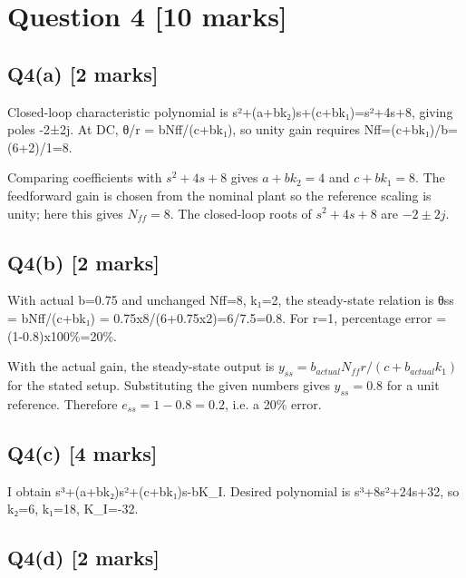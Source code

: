 \documentclass[11pt,a4paper]{article}
\begin{document}
\section*{Question 4 \hfill [10 marks]}
\subsection*{Q4(a) \hfill [2 marks]}

Closed-loop characteristic polynomial is s²+(a+bk₂)s+(c+bk₁)=s²+4s+8, giving poles -2±2j.
At DC, θ/r = bNff/(c+bk₁), so unity gain requires Nff=(c+bk₁)/b=(6+2)/1=8.\par\smallskip Comparing coefficients with $s^2+4s+8$ gives $a+bk_2=4$ and $c+bk_1=8$. The feedforward gain is chosen from the nominal plant so the reference scaling is unity; here this gives $N_{ff}=8$. The closed-loop roots of $s^2+4s+8$ are $-2\pm2j$.

\subsection*{Q4(b) \hfill [2 marks]}

With actual b=0.75 and unchanged Nff=8, k₁=2, the steady-state relation is θss = bNff/(c+bk₁) = 0.75x8/(6+0.75x2)=6/7.5=0.8.
For r=1, percentage error = (1-0.8)x100\%=20\%.\par\smallskip With the actual gain, the steady-state output is $y_{ss}=b_{actual}N_{ff}r/ (c+b_{actual}k_1)$ for the stated setup. Substituting the given numbers gives $y_{ss}=0.8$ for a unit reference. Therefore $e_{ss}=1-0.8=0.2$, i.e. a 20\% error.

\subsection*{Q4(c) \hfill [4 marks]}

I obtain s³+(a+bk₂)s²+(c+bk₁)s-bK\_I.
Desired polynomial is s³+8s²+24s+32, so k₂=6, k₁=18, K\_I=-32.

\subsection*{Q4(d) \hfill [2 marks]}

\vspace{2mm}
\end{document}

